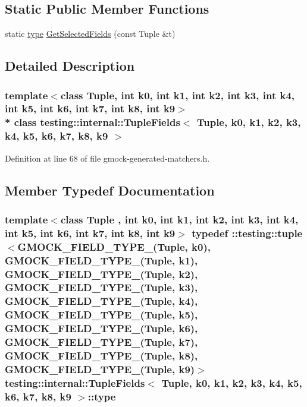\subsection*{Static Public Member Functions}
\begin{DoxyCompactItemize}
\item 
static \hyperlink{classtesting_1_1internal_1_1_tuple_fields_a5480877377ebc94bf3a6c6cab5c369bc}{type} \hyperlink{classtesting_1_1internal_1_1_tuple_fields_a020eefb4630e6dffe8bcadd0a70b1bab}{Get\+Selected\+Fields} (const Tuple \&t)
\end{DoxyCompactItemize}


\subsection{Detailed Description}
\subsubsection*{template$<$class Tuple, int k0, int k1, int k2, int k3, int k4, int k5, int k6, int k7, int k8, int k9$>$\\*
class testing\+::internal\+::\+Tuple\+Fields$<$ Tuple, k0, k1, k2, k3, k4, k5, k6, k7, k8, k9 $>$}



Definition at line 68 of file gmock-\/generated-\/matchers.\+h.



\subsection{Member Typedef Documentation}
\subsubsection[{\texorpdfstring{type}{type}}]{\setlength{\rightskip}{0pt plus 5cm}template$<$class Tuple , int k0, int k1, int k2, int k3, int k4, int k5, int k6, int k7, int k8, int k9$>$ typedef \+::testing\+::tuple$<${\bf G\+M\+O\+C\+K\+\_\+\+F\+I\+E\+L\+D\+\_\+\+T\+Y\+P\+E\+\_\+}(Tuple, k0), {\bf G\+M\+O\+C\+K\+\_\+\+F\+I\+E\+L\+D\+\_\+\+T\+Y\+P\+E\+\_\+}(Tuple, k1), {\bf G\+M\+O\+C\+K\+\_\+\+F\+I\+E\+L\+D\+\_\+\+T\+Y\+P\+E\+\_\+}(Tuple, k2), {\bf G\+M\+O\+C\+K\+\_\+\+F\+I\+E\+L\+D\+\_\+\+T\+Y\+P\+E\+\_\+}(Tuple, k3), {\bf G\+M\+O\+C\+K\+\_\+\+F\+I\+E\+L\+D\+\_\+\+T\+Y\+P\+E\+\_\+}(Tuple, k4), {\bf G\+M\+O\+C\+K\+\_\+\+F\+I\+E\+L\+D\+\_\+\+T\+Y\+P\+E\+\_\+}(Tuple, k5), {\bf G\+M\+O\+C\+K\+\_\+\+F\+I\+E\+L\+D\+\_\+\+T\+Y\+P\+E\+\_\+}(Tuple, k6), {\bf G\+M\+O\+C\+K\+\_\+\+F\+I\+E\+L\+D\+\_\+\+T\+Y\+P\+E\+\_\+}(Tuple, k7), {\bf G\+M\+O\+C\+K\+\_\+\+F\+I\+E\+L\+D\+\_\+\+T\+Y\+P\+E\+\_\+}(Tuple, k8), {\bf G\+M\+O\+C\+K\+\_\+\+F\+I\+E\+L\+D\+\_\+\+T\+Y\+P\+E\+\_\+}(Tuple, k9)$>$ {\bf testing\+::internal\+::\+Tuple\+Fields}$<$ Tuple, k0, k1, k2, k3, k4, k5, k6, k7, k8, k9 $>$\+::{\bf type}}\hypertarget{classtesting_1_1internal_1_1_tuple_fields_a5480877377ebc94bf3a6c6cab5c369bc}{}\label{classtesting_1_1internal_1_1_tuple_fields_a5480877377ebc94bf3a6c6cab5c369bc}


